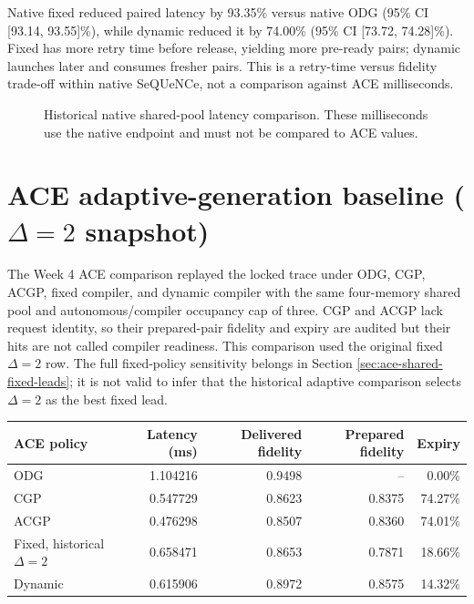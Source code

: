 \documentclass[11pt,a4paper]{report}
\begin{document}
Native fixed reduced paired latency by 93.35\% versus native ODG (95\% CI
[93.14, 93.55]\%), while dynamic reduced it by 74.00\% (95\% CI
[73.72, 74.28]\%). Fixed has more retry time before release, yielding more
pre-ready pairs; dynamic launches later and consumes fresher pairs. This is a
retry-time versus fidelity trade-off within native SeQUeNCe, not a comparison
against ACE milliseconds.

\begin{figure}[htbp]
\centering
{}
\caption{Historical native shared-pool latency comparison. These milliseconds
use the native endpoint and must not be compared to ACE values.}
\label{fig:historical-native-shared-latency}
\end{figure}

\section{ACE adaptive-generation baseline ($\Delta=2$ snapshot)}
The Week 4 ACE comparison replayed the locked trace under ODG, CGP, ACGP,
fixed compiler, and dynamic compiler with the same four-memory shared pool and
autonomous/compiler occupancy cap of three. CGP and ACGP lack request identity,
so their prepared-pair fidelity and expiry are audited but their hits are not
called compiler readiness. This comparison used the original fixed
$\Delta=2$ row. The full fixed-policy sensitivity belongs in Section
\ref{sec:ace-shared-fixed-leads}; it is not valid to infer that the historical
adaptive comparison selects $\Delta=2$ as the best fixed lead.

\begin{center}
\begin{tabular}{lrrrr}
\toprule
ACE policy & Latency (ms) & Delivered fidelity & Prepared fidelity & Expiry \\
\midrule
ODG & 1.104216 & 0.9498 & -- & 0.00\% \\
CGP & 0.547729 & 0.8623 & 0.8375 & 74.27\% \\
ACGP & 0.476298 & 0.8507 & 0.8360 & 74.01\% \\
Fixed, historical $\Delta=2$ & 0.658471 & 0.8653 & 0.7871 & 18.66\% \\
Dynamic & 0.615906 & 0.8972 & 0.8575 & 14.32\% \\
\bottomrule
\end{tabular}
\end{center}
\end{document}
